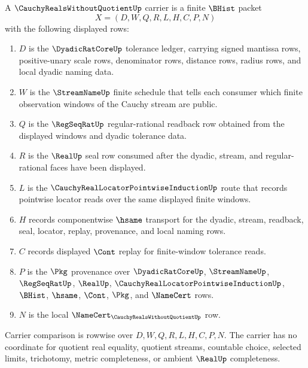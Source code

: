 \begin{definition}
\label{def:cauchy-reals-without-quotient-carrier}
A $\CauchyRealsWithoutQuotientUp$ carrier is a finite $\BHist$ packet
$$
X=(D,W,Q,R,L,H,C,P,N)
$$
with the following displayed rows:
\begin{enumerate}
\item $D$ is the $\DyadicRatCoreUp$ tolerance ledger, carrying signed mantissa rows, positive-unary scale rows, denominator rows, distance rows, radius rows, and local dyadic naming data.
\item $W$ is the $\StreamNameUp$ finite schedule that tells each consumer which finite observation windows of the Cauchy stream are public.
\item $Q$ is the $\RegSeqRatUp$ regular-rational readback row obtained from the displayed windows and dyadic tolerance data.
\item $R$ is the $\RealUp$ seal row consumed after the dyadic, stream, and regular-rational faces have been displayed.
\item $L$ is the $\CauchyRealLocatorPointwiseInductionUp$ route that records pointwise locator reads over the same displayed finite windows.
\item $H$ records componentwise $\hsame$ transport for the dyadic, stream, readback, seal, locator, replay, provenance, and local naming rows.
\item $C$ records displayed $\Cont$ replay for finite-window tolerance reads.
\item $P$ is the $\Pkg$ provenance over $\DyadicRatCoreUp$, $\StreamNameUp$, $\RegSeqRatUp$, $\RealUp$, $\CauchyRealLocatorPointwiseInductionUp$, $\BHist$, $\hsame$, $\Cont$, $\Pkg$, and $\NameCert$ rows.
\item $N$ is the local $\NameCert_{\CauchyRealsWithoutQuotientUp}$ row.
\end{enumerate}
Carrier comparison is rowwise over $D,W,Q,R,L,H,C,P,N$. The carrier has no coordinate for quotient real equality, quotient streams, countable choice, selected limits, trichotomy, metric completeness, or ambient $\RealUp$ completeness.
\end{definition}


